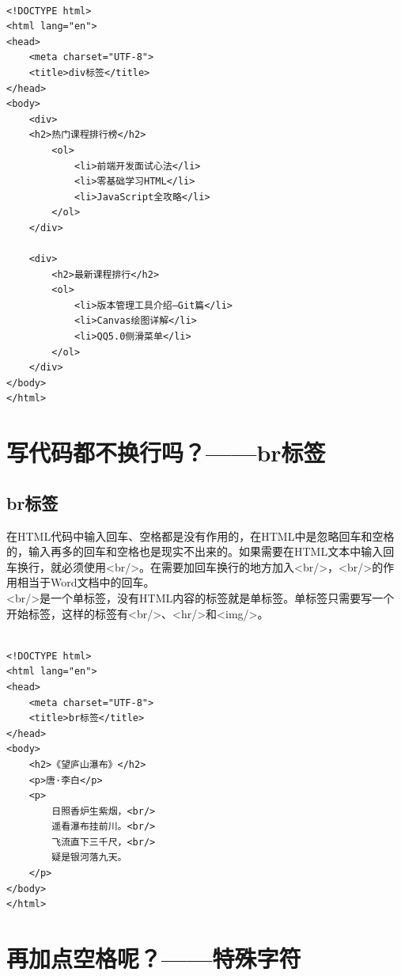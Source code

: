  \\
\begin{lstlisting}[style=htmlcssjs]
<!DOCTYPE html>
<html lang="en">
<head>
    <meta charset="UTF-8">
    <title>div标签</title>
</head>
<body>
    <div>
    <h2>热门课程排行榜</h2>
        <ol>
            <li>前端开发面试心法</li>
            <li>零基础学习HTML</li>
            <li>JavaScript全攻略</li>
        </ol>
    </div>

    <div>
        <h2>最新课程排行</h2>
        <ol>
            <li>版本管理工具介绍—Git篇</li>
            <li>Canvas绘图详解</li>
            <li>QQ5.0侧滑菜单</li>
        </ol>
    </div>
</body>
</html>
\end{lstlisting}

\newpage

\section{写代码都不换行吗？——br标签}

\subsection{br标签}

在HTML代码中输入回车、空格都是没有作用的，在HTML中是忽略回车和空格的，输入再多的回车和空格也是现实不出来的。如果需要在HTML文本中输入回车换行，就必须使用<br/>。在需要加回车换行的地方加入<br/>，<br/>的作用相当于Word文档中的回车。 \\

<br/>是一个单标签，没有HTML内容的标签就是单标签。单标签只需要写一个开始标签，这样的标签有<br/>、<hr/>和<img/>。 \\

 \\
\begin{lstlisting}[style=htmlcssjs]
<!DOCTYPE html>
<html lang="en">
<head>
    <meta charset="UTF-8">
    <title>br标签</title>
</head>
<body>
    <h2>《望庐山瀑布》</h2>
    <p>唐·李白</p>
    <p>
        日照香炉生紫烟，<br/>
        遥看瀑布挂前川。<br/>
        飞流直下三千尺，<br/>
        疑是银河落九天。
    </p>
</body>
</html>
\end{lstlisting}

\newpage

\section{再加点空格呢？——特殊字符}

